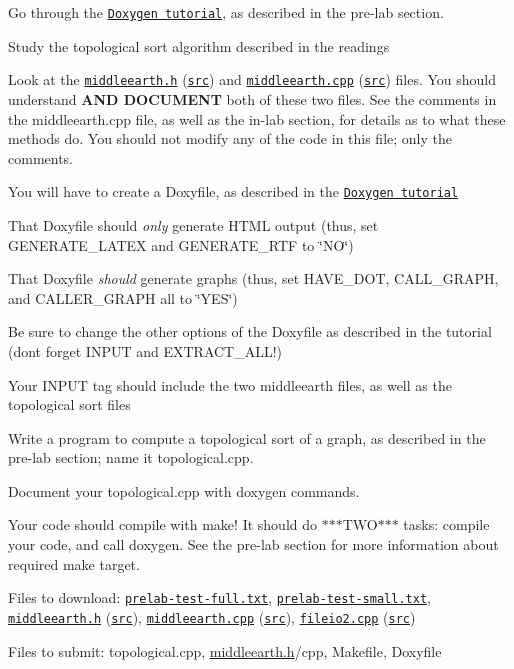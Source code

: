\begin{DoxyEnumerate}
\item Go through the \href{../../tutorials/11-doxygen/index.html}{\tt Doxygen tutorial}, as described in the pre-\/lab section.
\item Study the topological sort algorithm described in the readings
\item Look at the \href{middleearth.h.html}{\tt middleearth.\+h} (\href{middleearth.h}{\tt src}) and \href{middleearth.cpp.html}{\tt middleearth.\+cpp} (\href{middleearth.cpp}{\tt src}) files. You should understand {\bfseries A\+ND D\+O\+C\+U\+M\+E\+NT} both of these two files. See the comments in the middleearth.\+cpp file, as well as the in-\/lab section, for details as to what these methods do. You should not modify any of the code in this file; only the comments.
\begin{DoxyItemize}
\item You will have to create a Doxyfile, as described in the \href{../../tutorials/11-doxygen/index.html}{\tt Doxygen tutorial}
\item That Doxyfile should {\itshape only} generate H\+T\+ML output (thus, set {\ttfamily G\+E\+N\+E\+R\+A\+T\+E\+\_\+\+L\+A\+T\+EX} and {\ttfamily G\+E\+N\+E\+R\+A\+T\+E\+\_\+\+R\+TF} to \char`\"{}\+N\+O\char`\"{})
\item That Doxyfile {\itshape should} generate graphs (thus, set {\ttfamily H\+A\+V\+E\+\_\+\+D\+OT}, {\ttfamily C\+A\+L\+L\+\_\+\+G\+R\+A\+PH}, and {\ttfamily C\+A\+L\+L\+E\+R\+\_\+\+G\+R\+A\+PH} all to \char`\"{}\+Y\+E\+S\char`\"{})
\item Be sure to change the other options of the Doxyfile as described in the tutorial (don\textquotesingle{}t forget {\ttfamily I\+N\+P\+UT} and {\ttfamily E\+X\+T\+R\+A\+C\+T\+\_\+\+A\+LL}!)
\item Your {\ttfamily I\+N\+P\+UT} tag should include the two middleearth files, as well as the topological sort files
\end{DoxyItemize}
\item Write a program to compute a topological sort of a graph, as described in the pre-\/lab section; name it {\ttfamily topological.\+cpp}.
\item Document your topological.\+cpp with doxygen commands.
\item Your code should compile with {\ttfamily make}! It should do $\ast$$\ast$$\ast$\+T\+W\+O$\ast$$\ast$$\ast$ tasks\+: compile your code, and call {\ttfamily doxygen}. See the pre-\/lab section for more information about required make target.
\item Files to download\+: \href{prelab-test-full.txt}{\tt prelab-\/test-\/full.\+txt}, \href{prelab-test-small.txt}{\tt prelab-\/test-\/small.\+txt}, \href{middleearth.h.html}{\tt middleearth.\+h} (\href{middleearth.h}{\tt src}), \href{middleearth.cpp.html}{\tt middleearth.\+cpp} (\href{middleearth.cpp}{\tt src}), \href{fileio2.cpp.html}{\tt fileio2.\+cpp} (\href{fileio2.cpp}{\tt src})
\item Files to submit\+: topological.\+cpp, \hyperlink{middleearth_8h_source}{middleearth.\+h}/cpp, Makefile, Doxyfile
\end{DoxyEnumerate}

